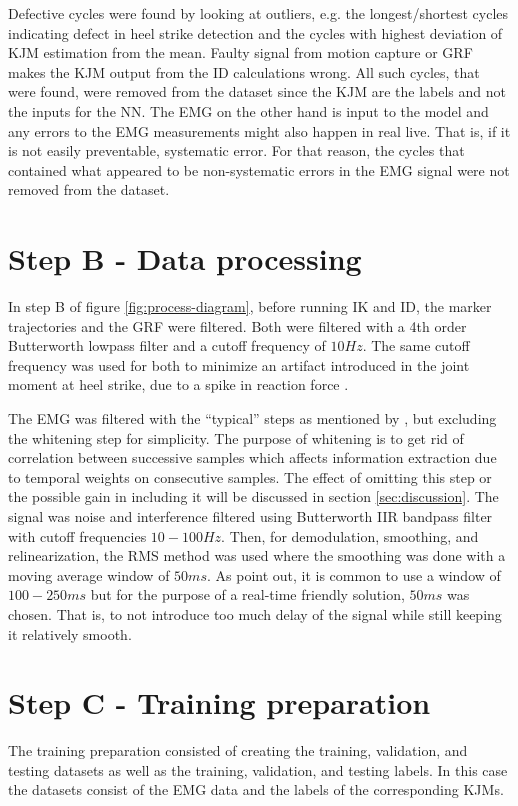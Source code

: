 \documentclass[../main.tex]{subfiles}
\begin{document}
Defective cycles were found by looking at outliers, e.g. the longest/shortest cycles indicating defect in heel strike detection and the cycles with highest deviation of \ac{KJM} estimation from the mean.
Faulty signal from motion capture or \ac{GRF} makes the \ac{KJM} output from the \ac{ID} calculations wrong.
All such cycles, that were found, were removed from the dataset since the \ac{KJM} are the labels and not the inputs for the \ac{NN}.
The \ac{EMG} on the other hand is input to the model and any errors to the \ac{EMG} measurements might also happen in real live.
That is, if it is not easily preventable, systematic error.
For that reason, the cycles that contained what appeared to be non-systematic errors in the \ac{EMG} signal were not removed from the dataset.

\section{Step B - Data processing}
\label{sec:data-processing}
In step B of figure \ref{fig:process-diagram}, before running \ac{IK} and \ac{ID}, the marker trajectories and the \ac{GRF} were filtered.
Both were filtered with a 4th order Butterworth lowpass filter and a cutoff frequency of $10Hz$. 
The same cutoff frequency was used for both to minimize an artifact introduced in the joint moment at heel strike, due to a spike in reaction force \cite{Kristianslund2012}.

The \ac{EMG} was filtered with the ``typical'' steps as mentioned by \textcite[99]{Clancy2016}, but excluding the whitening step for simplicity.
The purpose of whitening is to get rid of correlation between successive samples which affects information extraction due to temporal weights on consecutive samples.
The effect of omitting this step or the possible gain in including it will be discussed in section \ref{sec:discussion}.
The signal was noise and interference filtered using Butterworth IIR bandpass filter with cutoff frequencies $10-100Hz$. 
Then, for demodulation, smoothing, and relinearization, the RMS method was used where the smoothing was done with a moving average window of $50ms$. 
As \textcite{Clancy2016} point out, it is common to use a window of $100-250 ms$ but for the purpose of a real-time friendly solution, $50ms$ was chosen.
That is, to not introduce too much delay of the signal while still keeping it relatively smooth.

\section{Step C - Training preparation}
The training preparation consisted of creating the training, validation, and testing datasets as well as the training, validation, and testing labels.
In this case the datasets consist of the \ac{EMG} data and the labels of the corresponding \acp{KJM}.
\end{document}
